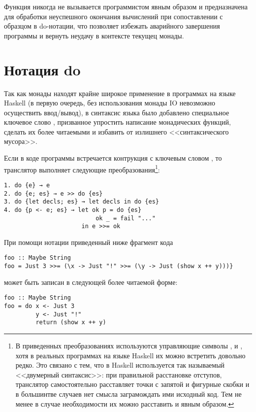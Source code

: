 Функция  никогда не вызывается программистом явным образом и предназначена для обработки неуспешного окончания вычислений при сопоставлении с образцом в do-нотации, что позволяет избежать аварийного завершения программы и вернуть неудачу в контексте текущец монады.

\section{Нотация do}

Так как монады находят крайне широкое применение в программах на языке Haskell (в первую очередь, без использования монады IO невозможно осуществить ввод/вывод), в синтаксис языка было добавлено специальное ключевое слово , призванное упростить написание монадических функций, сделать их более читаемыми и избавить от излишнего <<синтаксического мусора>>.

Если в коде программы встречается контрукция с ключевым словом , то транслятор выполняет следующие преобразования\footnote{В приведенных преобразованиях используются управляющие символы \Code{;}, \Code{\{} и \Code{\}}, хотя в реальных программах на языке Haskell их можно встретить довольно редко. Это связано с тем, что в Haskell используется так называемый <<двумерный синтаксис>>: при правильной расстановке отступов, транслятор самостоятельно расставляет точки с запятой и фигурные скобки и в большинтве случаев нет смысла заграмождать ими исходный код. Тем не менее в случае необходимости их можно расставить и явным образом.}:

\begin{verbatim}
1. do {e} → e
2. do {e; es} → e >> do {es}
3. do {let decls; es} → let decls in do {es}
4. do {p <- e; es} → let ok p = do {es}
                          ok _ = fail "..."
                      in e >>= ok
\end{verbatim}

При помощи нотации  приведенный ниже фрагмент кода

\begin{verbatim}
foo :: Maybe String
foo = Just 3 >>= (\x -> Just "!" >>= (\y -> Just (show x ++ y)))}
\end{verbatim}

может быть записан в следующей более читаемой форме:

\begin{verbatim}
foo :: Maybe String
foo = do x <- Just 3 
         y <- Just "!" 
         return (show x ++ y)
\end{verbatim}

